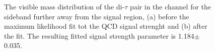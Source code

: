 \begin{figure}[h!]
\begin{center}
\end{center}
\caption{The visible mass distribution of the di-$\tau$ pair in the \mutau channel for the sideband further away from the signal region, (a) before
the maximum likelihood fit tot the QCD signal strenght and (b) after the fit. The resulting fitted signal strength parameter
is 1.184$\pm$0.035.}
\label{fig:mssm_qcdosss_mtfar}
\end{figure}

